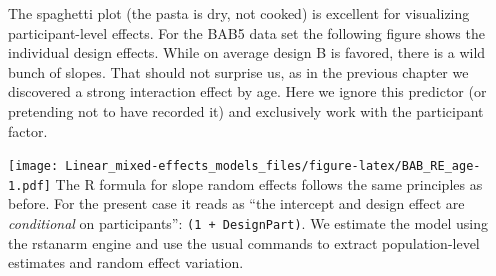 \documentclass[]{svmono}
\newenvironment{Shaded}{\begin{snugshade}}{\end{snugshade}}
\newcommand{\KeywordTok}[1]{\textcolor[rgb]{0.13,0.29,0.53}{\textbf{#1}}}
\newcommand{\DataTypeTok}[1]{\textcolor[rgb]{0.13,0.29,0.53}{#1}}
\newcommand{\DecValTok}[1]{\textcolor[rgb]{0.00,0.00,0.81}{#1}}
\newcommand{\StringTok}[1]{\textcolor[rgb]{0.31,0.60,0.02}{#1}}
\newcommand{\OtherTok}[1]{\textcolor[rgb]{0.56,0.35,0.01}{#1}}
\newcommand{\OperatorTok}[1]{\textcolor[rgb]{0.81,0.36,0.00}{\textbf{#1}}}
\newcommand{\NormalTok}[1]{#1}
\theoremstyle{definition}
\theoremstyle{definition}
\theoremstyle{definition}
\theoremstyle{remark}
\begin{document}
The spaghetti plot (the pasta is dry, not cooked) is excellent for
visualizing participant-level effects. For the BAB5 data set the
following figure shows the individual design effects. While on average
design B is favored, there is a wild bunch of slopes. That should not
surprise us, as in the previous chapter we discovered a strong
interaction effect by age. Here we ignore this predictor (or pretending
not to have recorded it) and exclusively work with the participant
factor.

\begin{Shaded}
\end{Shaded}

\texttt{[image: Linear\_mixed-effects\_models\_files/figure-latex/BAB\_RE\_age-1.pdf]}
The R formula for slope random effects follows the same principles as
before. For the present case it reads as ``the intercept and design
effect are \emph{conditional} on participants'':
\texttt{(1\ +\ Design\textbar{}Part)}. We estimate the model using the
rstanarm engine and use the usual commands to extract population-level
estimates and random effect variation.
\end{document}
